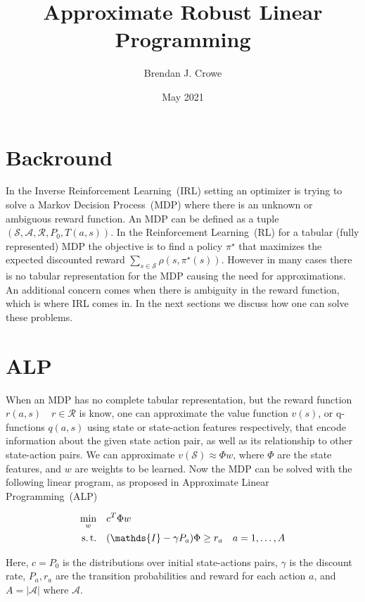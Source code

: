\documentclass{homework}
\title{Approximate Robust Linear Programming}
\author{Brendan J. Crowe}
\date{May 2021}
\newcommand{\states}{\mathcal{S}}
\newcommand{\actions}{\mathcal{A}}
\newcommand{\rewards}{\mathcal{R}}
\begin{document}
\maketitle

\section{Backround}

In the Inverse Reinforcement Learning~(IRL) setting an optimizer is trying to solve a Markov Decision Process~(MDP) where there is an unknown or ambiguous reward function. An MDP can be defined as a tuple $(\states, \actions, \rewards, P_0, T(a,s))$. In the Reinforcement Learning~(RL) for a tabular (fully represented) MDP the objective is to find a policy $\pi^{\star}$ that maximizes the expected discounted reward $\sum_{s \in \states} \rho(s, \pi^{\star}(s))$. However in many cases there is no tabular representation for the MDP causing the need for approximations. An additional concern comes when there is ambiguity in the reward function, which is where IRL comes in. In the next sections we discuss how one can solve these problems.
\section{ALP}

When an MDP has no complete tabular representation, but the reward function $r(a,s) \quad r \in \rewards$ is know, one can approximate the value function $v(s)$, or q-functions $q(a,s)$ using state or state-action features respectively, that encode information about the given state action pair, as well as its relationship to other state-action pairs. We can approximate $v(\states) \approx \Phi w$, where $\Phi$ are the state features, and $w$ are weights to be learned. Now the MDP can be solved with the following linear program, as proposed in Approximate Linear Programming~(ALP)\cite{10.1287/opre.51.6.850.24925}

\begin{equation}
\begin{aligned}
\min_{w} \quad &c^T\Phi w\\
\text{s.\,t.}\quad & (\mathds{I} - \gamma P_a) \Phi \ge r_{a} \quad a=1,\ldots,A
\end{aligned}
\end{equation}

Here, $c = P_0$ is the distributions over initial state-actions pairs, $\gamma$ is the discount rate, $P_a, r_a$ are the transition probabilities and reward for each action $a$, and $A = |\actions|$ where $\actions$.
\end{document}
